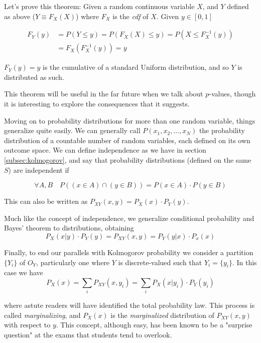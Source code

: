 Let's prove this theorem:
Given a random continuous variable $X$, and $Y$ defined as above ($Y \equiv F_X(X)$) where $F_X$ is the \emph{cdf} of $X$. Given $y\in[0,1]$

\begin{align*}
	F_Y(y) &= P\left(Y\leq y\right) = P\left(F_X(X)\leq y\right) = P\left(X\leq F_X^{-1}(y)\right)\\
	&= F_X\left(F_X^{-1}(y)\right) = y
\end{align*}

$F_Y(y) = y$ is the cumulative of a standard Uniform distribution, and so $Y$ is distributed as such.

This theorem will be useful in the far future when we talk about $p$-values, though it is interesting to explore the consequences that it suggests.

Moving on to probability distributions for more than one random variable, things generalize quite easily. We can generally call $P(x_1, \allowbreak x_2, \allowbreak \dots, \allowbreak x_N)$ the probability distribution of a countable number of random variables, each defined on its own outcome space. We can define independence as we have in section \ref{subsec:kolmogorov}, and say that probability distributions (defined on the same $S$) are independent if 


	\[
	\forall A,B \quad P\left( \left( x\in A\right) \cap \left( y\in B\right) \right)  = P\left( x\in A\right) \cdot P\left( y\in B\right) 
	\]
	


This can also be written as $P_{XY}(x,y)=P_X(x)\cdot P_Y(y)$.



Much like the concept of independence, we generalize conditional probability and Bayes' theorem to distributions, obtaining
	\[
	P_X(x|y)\cdot P_Y(y) = P_{XY}(x,y) = P_Y(y|x)\cdot P_x(x)
	\]
	
Finally, to end our parallels with Kolmogorov probability we consider a partition $\{Y_i\}$ of $O_Y$, particularly one where $Y$ is discrete-valued such that $Y_i = \{y_i\}$. In this case we have
	\[
	P_X(x) = \sum_i P_{XY}(x,y_i)=\sum_i P_X(x|y_i)\cdot P_Y(y_i)
	\]
	
where astute readers will have identified the total probability law. This process is called \emph{marginalizing}, and $P_X(x)$ is the \emph{marginalized} distribution of $P_{XY}(x,y)$ with respect to $y$. This concept, although easy, has been known to be a "surprise question" at the exams that students tend to overlook.

